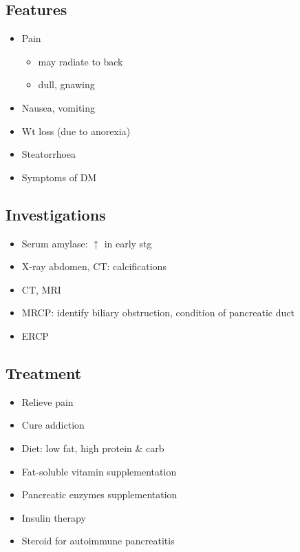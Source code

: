 \documentclass[
  12pt,
]{memoir}
\providecommand{\tightlist}{%
  \setlength{\itemsep}{0pt}\setlength{\parskip}{0pt}}
\begin{document}
\hypertarget{features-11}{%
\subsection{Features}\label{features-11}}

\begin{itemize}
\tightlist
\item
  Pain

  \begin{itemize}
  \tightlist
  \item
    may radiate to back
  \item
    dull, gnawing
  \end{itemize}
\item
  Nausea, vomiting
\item
  Wt loss (due to anorexia)
\item
  Steatorrhoea
\item
  Symptoms of DM
\end{itemize}

\hypertarget{investigations-10}{%
\subsection{Investigations}\label{investigations-10}}

\begin{itemize}
\tightlist
\item
  Serum amylase: \(\uparrow\) in early stg
\item
  X-ray abdomen, CT: calcifications
\item
  CT, MRI
\item
  MRCP: identify biliary obstruction, condition of pancreatic duct
\item
  ERCP
\end{itemize}

\hypertarget{treatment-10}{%
\subsection{Treatment}\label{treatment-10}}

\begin{itemize}
\tightlist
\item
  Relieve pain
\item
  Cure addiction
\item
  Diet: low fat, high protein \& carb
\item
  Fat-soluble vitamin supplementation
\item
  Pancreatic enzymes supplementation
\item
  Insulin therapy
\item
  Steroid for autoimmune pancreatitis
\end{itemize}
\end{document}
